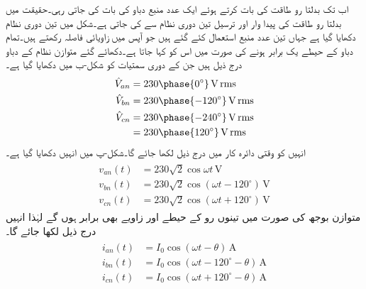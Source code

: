 اب تک بدلتا رو طاقت کی بات کرتے ہوئے  ایک عدد منبع دباو کی بات کی جاتی رہی۔حقیقت میں بدلتا رو طاقت کی پیدا وار اور ترسیل تین دوری نظام سے کی جاتی ہے۔شکل  میں تین دوری نظام دکھایا گیا ہے جہاں تین عدد منبع استعمال کئے گئے ہیں جو آپس میں  زاویائی فاصلہ رکھتے ہیں۔تمام دباو کے حیطے یک برابر ہونے کی صورت میں اس کو  کہا جاتا ہے۔دکھائے گئے متوازن نظام کے دباو درج ذیل ہیں جن کے دوری سمتیات کو شکل-ب میں دکھایا گیا ہے۔
\begin{gather}
\begin{aligned}
\hat{V}_{an}&=230 \phase{0^{\circ}}\,\si{\volt}\, \rms\\
\hat{V}_{bn}&=230 \phase{-120^{\circ}}\,\si{\volt}\, \rms\\
\hat{V}_{cn}&=230 \phase{-240^{\circ}}\,\si{\volt}\, \rms\\
&=230 \phase{120^{\circ}}\,\si{\volt}\, \rms
\end{aligned}
\end{gather}
انہیں کو وقتی دائرہ کار میں درج ذیل لکھا جائے گا۔شکل-پ میں انہیں دکھایا گیا ہے۔
\begin{gather}
\begin{aligned}\label{مساوات_تین_دوری_ستارہ_الف}
v_{an}(t)&=230\sqrt{2} \cos\omega t \,\si{\volt}\\
v_{bn}(t)&=230\sqrt{2} \cos(\omega t-120^{\circ})\,\si{\volt}\\
v_{cn}(t)&=230\sqrt{2} \cos(\omega t +120^{\circ})\,\si{\volt}
\end{aligned}
\end{gather}
متوازن بوجھ کی صورت میں تینوں رو کے حیطے اور زاویے بھی برابر ہوں گے لہٰذا انہیں درج ذیل لکھا جائے گا۔
\begin{gather}
\begin{aligned}
i_{an}(t)&=I_0 \cos(\omega t -\theta)\,\si{\ampere}\\
i_{bn}(t)&=I_0 \cos(\omega t-120^{\circ}-\theta)\,\si{\ampere}\\
i_{cn}(t)&=I_0 \cos(\omega t +120^{\circ}-\theta)\,\si{\ampere}
\end{aligned}
\end{gather}
%
